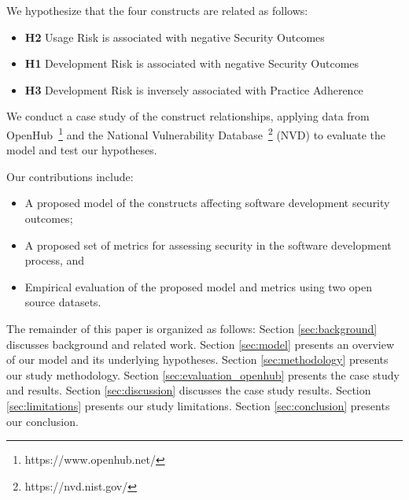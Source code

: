 We hypothesize that the four constructs are related as follows:
\begin{itemize}
	\item \textbf{H2} Usage Risk is associated with negative Security Outcomes
	\item \textbf{H1} Development Risk is associated with negative Security Outcomes
\item \textbf{H3} Development Risk is inversely associated with Practice Adherence  	
\end{itemize}
	
We conduct a case study of the construct relationships, applying data from OpenHub~\footnote{https://www.openhub.net/} and the National Vulnerability Database~\footnote{https://nvd.nist.gov/} (NVD) to evaluate the model and test our hypotheses.
  
Our contributions include:
\begin{itemize}
	\item A proposed model of the constructs affecting software development security outcomes;
	\item A proposed set of metrics for assessing security in the software development process, and
	\item Empirical evaluation of the proposed model and metrics using two open source datasets.
\end{itemize}
The remainder of this paper is organized as follows:  Section \ref{sec:background} discusses background and related work. Section \ref{sec:model} presents an overview of our model and its underlying hypotheses. Section \ref{sec:methodology} presents our study methodology. Section \ref{sec:evaluation_openhub} presents the case study and results. Section \ref{sec:discussion} discusses the case study results. Section \ref{sec:limitations} presents our study limitations. Section \ref{sec:conclusion} presents our conclusion.

